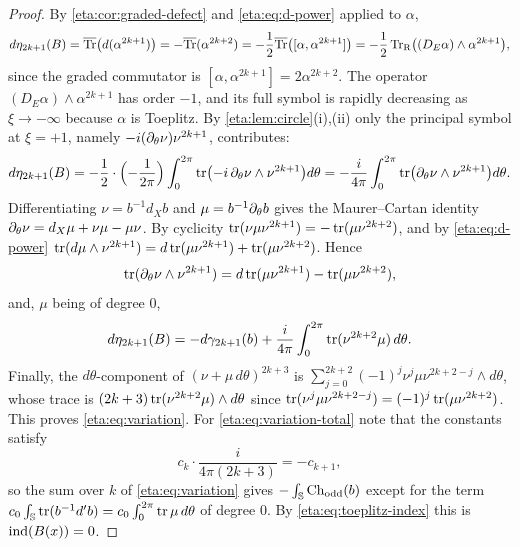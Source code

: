 \begin{proof} By \cref{eta:cor:graded-defect} and \eqref{eta:eq:d-power} applied to
$\alpha$,
\[
d\eta_{2k+1}(B)=\overline{\operatorname{Tr}}\bigl(d(\alpha^{2k+1})\bigr)=-\overline{\operatorname{Tr}}(\alpha^{2k+2})
=-\frac12\overline{\operatorname{Tr}}\bigl([\alpha,\alpha^{2k+1}]\bigr)
=-\frac12\operatorname{Tr}_{\mathrm{R}}\bigl((D_E\alpha)\wedge\alpha^{2k+1}\bigr),
\]
since the graded commutator is $[\alpha,\alpha^{2k+1}]=2\alpha^{2k+2}$. The operator
$(D_E\alpha)\wedge\alpha^{2k+1}$ has order $-1$, and its full symbol is rapidly
decreasing as $\xi\to-\infty$ because $\alpha$ is Toeplitz. By
\cref{eta:lem:circle}(i),(ii) only the principal symbol at $\xi=+1$, namely
$-i(\partial_\theta\nu)\nu^{2k+1}$, contributes:
\[
d\eta_{2k+1}(B)=-\frac12\cdot\Bigl(-\frac1{2\pi}\Bigr)\int_0^{2\pi}\operatorname{tr}\bigl(-i\,\partial_\theta\nu\wedge
\nu^{2k+1}\bigr)d\theta=-\frac{i}{4\pi}\int_0^{2\pi}\operatorname{tr}\bigl(\partial_\theta\nu\wedge\nu^{2k+1}\bigr)d\theta.
\]
Differentiating $\nu=b^{-1}d_Xb$ and $\mu=b^{-1}\partial_\theta b$ gives the Maurer--Cartan
identity $\partial_\theta\nu=d_X\mu+\nu\mu-\mu\nu$. By cyclicity
$\operatorname{tr}(\nu\mu\nu^{2k+1})=-\operatorname{tr}(\mu\nu^{2k+2})$, and by \eqref{eta:eq:d-power}
$\operatorname{tr}(d\mu\wedge\nu^{2k+1})=d\operatorname{tr}(\mu\nu^{2k+1})+\operatorname{tr}(\mu\nu^{2k+2})$. Hence
\[
\operatorname{tr}(\partial_\theta\nu\wedge\nu^{2k+1})=d\operatorname{tr}(\mu\nu^{2k+1})-\operatorname{tr}(\mu\nu^{2k+2}),
\]
and, $\mu$ being of degree $0$,
\[
d\eta_{2k+1}(B)=-d\gamma_{2k+1}(b)+\frac{i}{4\pi}\int_0^{2\pi}\operatorname{tr}(\nu^{2k+2}\mu)\,d\theta.
\]
Finally, the $d\theta$-component of $(\nu+\mu\,d\theta)^{2k+3}$ is
$\sum_{j=0}^{2k+2}(-1)^j\nu^j\mu\nu^{2k+2-j}\wedge d\theta$, whose trace is
$(2k+3)\operatorname{tr}(\nu^{2k+2}\mu)\wedge d\theta$ since $\operatorname{tr}(\nu^j\mu\nu^{2k+2-j})=(-1)^j\operatorname{tr}(\mu\nu^{2k+2})$.
This proves \eqref{eta:eq:variation}. For \eqref{eta:eq:variation-total} note that the
constants satisfy
\[
c_k\cdot\frac{i}{4\pi(2k+3)}=-c_{k+1},
\]
so the sum over $k$ of \eqref{eta:eq:variation} gives $-\int_{\mathbb{S}}\operatorname{Ch}_{\mathrm{odd}}(b)$ except
for the term $c_0\int_{\mathbb{S}}\operatorname{tr}(b^{-1}d'b)=c_0\int_0^{2\pi}\operatorname{tr}\mu\,d\theta$ of degree
$0$. By \eqref{eta:eq:toeplitz-index} this is $\operatorname{ind}(B(x))=0$.
\end{proof}

